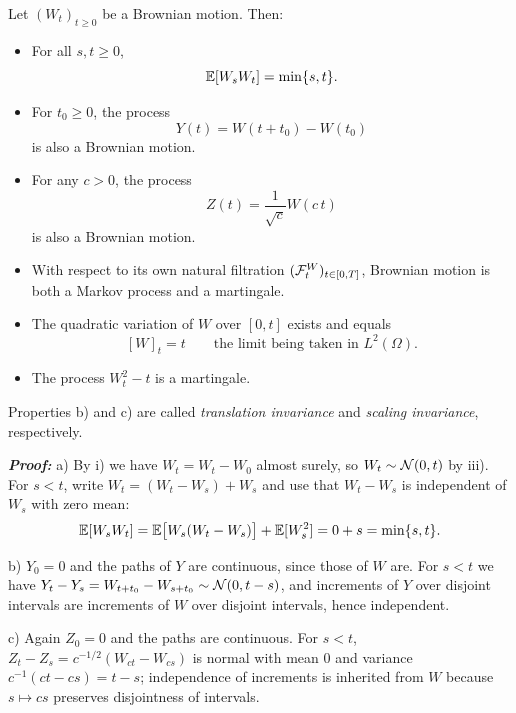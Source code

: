 \begin{proposition} \label{prop:bm-properties}
Let \((W_t)_{t \geq 0}\) be a Brownian motion. Then:
\begin{itemize}
    \item[a)] For all 
    \(s,t \geq 0\),
    \begin{equation}
        \mathbb{E}[W_s W_t] = \min\{s,t\}.
    \end{equation}
    \item[b)] For \(t_0 \geq 0\), the process
    \begin{equation}
        Y(t) = W(t+t_0) - W(t_0)
    \end{equation}
    is also a Brownian motion.
    \item[c)] For any \(c > 0\), the process
    \begin{equation}
        Z(t) = \frac{1}{\sqrt{c}} W(c\,t)
    \end{equation}
    is also a Brownian motion.
    \item[d)] With respect to its own natural filtration $(\mathcal{F}^{W}_t)_{t\in[0,T]}$, Brownian motion is both a Markov
    process and a martingale.
    \item[e)] The quadratic variation of \(W\) over \([0,t]\) exists and equals
    \begin{equation}\label{eq:bmqv}
        [W]_t = t \qquad \text{the limit being taken in } L^2(\Omega).
    \end{equation}
    \item[f)] The process $W_t^2 - t$ is a martingale.
\end{itemize}
Properties b) and c) are called \emph{translation invariance} 
and \emph{scaling invariance}, respectively.
\end{proposition}

\textbf{\textit{Proof:}} a) By i) we have $W_t = W_t - W_0$ almost surely, so $W_t \sim \mathcal{N}(0,t)$
by iii). For $s < t$, write $W_t = (W_t - W_s) + W_s$ and use that $W_t - W_s$ is independent of
$W_s$ with zero mean:
\[
\mathbb{E}[W_sW_t] = \mathbb{E}\bigl[W_s(W_t-W_s)\bigr] + \mathbb{E}[W_s^2] = 0 + s = \min\{s,t\}.
\]

b) $Y_0 = 0$ and the paths of $Y$ are continuous, since those of $W$ are. For $s<t$ we have
$Y_t - Y_s = W_{t+t_0} - W_{s+t_0} \sim \mathcal{N}(0,t-s)$, and increments of $Y$ over disjoint
intervals are increments of $W$ over disjoint intervals, hence independent.

c) Again $Z_0=0$ and the paths are continuous. For $s<t$,
$Z_t - Z_s = c^{-1/2}(W_{c t} - W_{c s})$ is normal with mean $0$ and variance
$c^{-1}(c t - c s) = t-s$; independence of increments is inherited from $W$ because
$s \mapsto c s$ preserves disjointness of intervals.

